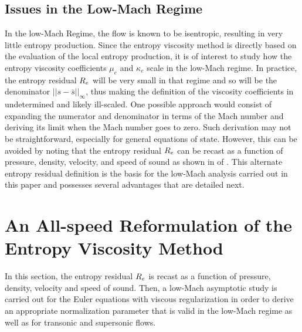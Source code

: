 \subsection{Issues in the Low-Mach Regime} 

In the low-Mach Regime, the flow is known to be isentropic, resulting in very little entropy production. Since the entropy viscosity method is directly based on the evaluation of the local entropy production, it is of interest to study how the entropy viscosity coefficients $\mu_e$ and $\kappa_e$ scale in the low-Mach regime. In practice, the entropy residual $R_e$ will be very small in that regime and so will be the denominator $|| s - \bar{s} ||_\infty$, thus making the definition of the viscosity coefficients in  undetermined and likely ill-scaled.  One possible approach would consist of expanding the numerator and denominator in terms of the Mach number and deriving its limit when the Mach number goes to zero. Such derivation may not be straightforward, especially for general equations of state. However, this can be avoided by noting that the entropy residual $R_e$ can be recast as a function of pressure, density, velocity, and speed of sound as shown in  of . This alternate entropy residual definition is the basis for the low-Mach analysis carried out in this paper and possesses several advantages that are detailed next. %

\section{An All-speed Reformulation of the Entropy Viscosity Method} \label{sec:extension}

In this section, the entropy residual $R_e$ is recast as a function of pressure, density, velocity and speed of sound. Then, a low-Mach asymptotic study is carried out for the Euler equations with viscous regularization in order to derive an appropriate normalization parameter that is valid in the low-Mach regime as well as for transonic and supersonic flows. 

